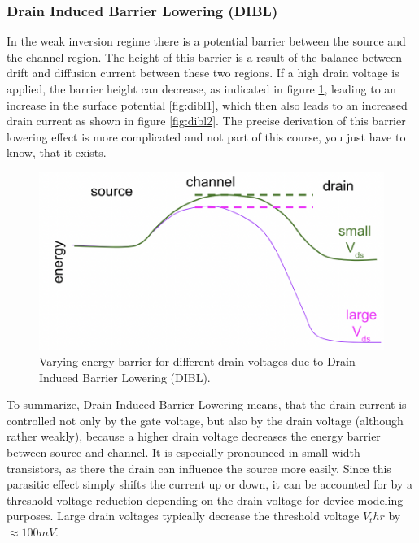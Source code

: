 \subsubsection{Drain Induced Barrier Lowering (DIBL)}\label{sec:dibl}

In the weak inversion regime there is a potential barrier between the source and the channel region. The height of this barrier is a result of the balance between drift and diffusion current between these two regions. If a high drain voltage is applied, the barrier height can decrease, as indicated in figure \ref{fig:dibl3}, leading to an increase in the surface potential \ref{fig:dibl1}, which then also leads to an increased drain current as shown in figure \ref{fig:dibl2}. The precise derivation of this barrier lowering effect is more complicated and not part of this course, you just have to know, that it exists.\\

\begin{figure}[H]
    \centering
    \includegraphics[width=0.65\linewidth]{../../Figures/dibl3.png}
    \caption{Varying energy barrier for different drain voltages due to Drain Induced Barrier Lowering (DIBL).}
    \label{fig:dibl3}
\end{figure}

To summarize, Drain Induced Barrier Lowering means, that the drain current is controlled not only by the gate voltage, but also by the drain voltage (although rather weakly), because a higher drain voltage decreases the energy barrier between source and channel. It is especially pronounced in small width transistors, as there the drain can influence the source more easily. Since this parasitic effect simply shifts the current up or down, it can be accounted for by a threshold voltage reduction depending on the drain voltage for device modeling purposes. Large drain voltages typically decrease the threshold voltage $V_thr$ by $\approx 100mV$. 

